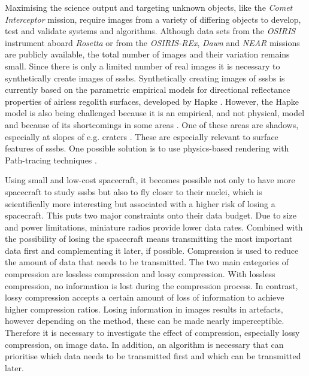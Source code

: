 Maximising the science output and targeting unknown objects, like the \textit{Comet Interceptor} mission, require images from a variety of differing objects to develop, test and validate systems and algorithms. Although data sets from the \textit{OSIRIS} instrument aboard \textit{Rosetta} \cite{osirisArchive} or from the \textit{OSIRIS-REx}, \textit{Dawn} and \textit{NEAR} missions \cite{palmer2014small} are publicly available, the total number of images and their variation remains small. Since there is only a limited number of real images it is necessary to synthetically create images of \gls{sssb}s. Synthetically creating images of \gls{sssb}s is currently based on the parametric empirical models for directional reflectance properties of airless regolith surfaces, developed by Hapke \cite{Hapke1981BidirectionalTheory, hapke1981bidirectional2, Hapke1984BidirectionalRoughness, Hapke1986BidirectionalEffect, Hapke2002BidirectionalScattering, Hapke2008BidirectionalPorosity, Hapke2012Bidirectional7}. However, the Hapke model is also being challenged because it is an empirical, and not physical, model and because of its shortcomings in some areas \cite{shkuratov2012critical}. One of these areas are shadows, especially at slopes of e.g. craters \cite{shkuratov2012critical}. These are especially relevant to surface features of \gls{sssb}s. One possible solution is to use physics-based rendering with Path-tracing techniques \cite{shkuratov2012critical, lafortune1996mathematical}.

Using small and low-cost spacecraft, it becomes possible not only to have more spacecraft to study \gls{sssb}s but also to fly closer to their nuclei, which is scientifically more interesting but associated with a higher risk of losing a spacecraft. This puts two major constraints onto their data budget. Due to size and power limitations, miniature radios provide lower data rates. Combined with the possibility of losing the spacecraft means transmitting the most important data first and complementing it later, if possible. Compression is used to reduce the amount of data that needs to be transmitted. The two main categories of compression are lossless compression and lossy compression. With lossless compression, no information is lost during the compression process. In contrast, lossy compression accepts a certain amount of loss of information to achieve higher compression ratios. Losing information in images results in artefacts, however depending on the method, these can be made nearly imperceptible. Therefore it is necessary to investigate the effect of compression, especially lossy compression, on image data. In addition, an algorithm is necessary that can prioritise which data needs to be transmitted first and which can be transmitted later.

